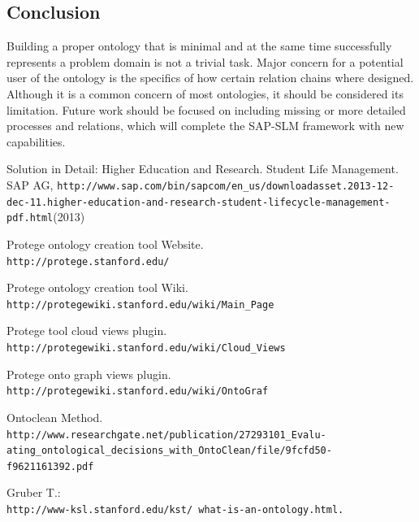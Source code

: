 \documentclass{article}    %
\begin{document}
\subsection{Conclusion}
%
Building a proper ontology that is minimal and at the same time successfully represents a problem domain is not a trivial task. Major concern for a potential user of the ontology is the specifics of how certain relation chains where designed. Although it is a common concern of most ontologies, it should be considered its limitation. Future work should be focused on including missing or more detailed processes and relations, which will complete the SAP-SLM framework with new capabilities.
%
%
\begin{thebibliography}{99}
%
Solution in Detail: Higher Education and Research. Student Life Management.
SAP AG, \texttt{http://www.sap.com/bin/sapcom/en\_us/downloadasset.2013-12-dec-11.higher-education-and-research-student-lifecycle-\newline management-pdf.html}(2013)

Protege ontology creation tool Website.\\
\texttt{http://protege.stanford.edu/}

Protege ontology creation tool Wiki.\\
\texttt{http://protegewiki.stanford.edu/wiki/Main\_Page}

Protege tool cloud views plugin.\\
\texttt{http://protegewiki.stanford.edu/wiki/Cloud\_Views}

Protege onto graph views plugin.\\
\texttt{http://protegewiki.stanford.edu/wiki/OntoGraf}

Ontoclean Method.\\
\texttt{http://www.researchgate.net/publication/27293101\_Evalu-\newline
ating\_ontological\_decisions\_with\_OntoClean/file/9fcfd50-\newline
f9621161392.pdf}

Gruber T.:
\\
\texttt{http://www-ksl.stanford.edu/kst/ what-is-an-ontology.html.} 



\end{thebibliography}
\end{document}
